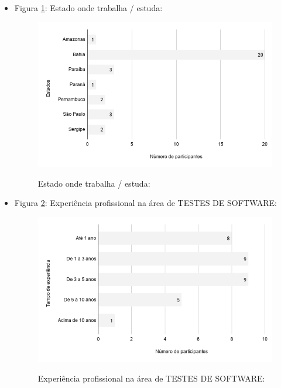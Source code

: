 \begin{itemize}
    
    \item Figura \ref{figure:s_estado}: Estado onde trabalha / estuda:
    \begin{figure}[!htb]
    \centering
    \includegraphics[width=.80\textwidth]{images/s_estado.png}
    \label{figure:s_estado}
    \caption{Estado onde trabalha / estuda:}
    \end{figure}


    \item Figura \ref{figure:s_experienciatestes}: Experiência profissional na área de TESTES DE SOFTWARE:
    \begin{figure}[!htb]
    \centering
    \includegraphics[width=.80\textwidth]{images/s_experienciatestes.png}
    \label{figure:s_experienciatestes}
    \caption{Experiência profissional na área de TESTES DE SOFTWARE:}
    \end{figure}
    


\end{itemize}

